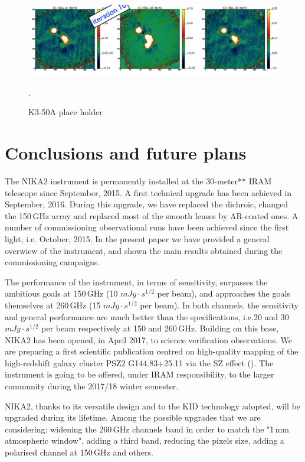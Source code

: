 \documentclass[]{aa} %
\begin{document}
\begin{figure}[h]
   \centering
   \includegraphics[width=.95\linewidth]{K3-50A.png}
   \caption{K3-50A place holder}. 
   \label{fig:k3-50a}
\end{figure}





\section{Conclusions and future plans}

The NIKA2 instrument is permanently installed at the 30-meter** IRAM telescope since September, 2015. A first technical upgrade has been achieved in September, 2016. During this upgrade, we have replaced the dichroic, changed the 150\,GHz array and replaced most of the smooth lenses by AR-coated ones. A number of commissioning observational runs have been achieved since the first light, i.e. October, 2015. In the present paper we have provided a general overwiew of the instrument, and shown the main results obtained during the commissioning campaigns. 

The performance of the instrument, in terms of sensitivity, surpasses the ambitious goals at 150\,GHz (10 $mJy \cdot s^{1/2}$ per beam), and approaches the goals themselves at 260\,GHz (15 $mJy \cdot s^{1/2}$ per beam). In both channels, the sensitivity and general performance are much better than the specifications, i.e.20 and 30 $mJy \cdot s^{1/2}$ per beam respectively at 150 and 260\,GHz. Building on this base, NIKA2 has been opened, in April 2017, to science verification observations. We are preparing a first scientific publication centred on high-quality mapping of the high-redshift galaxy cluster PSZ2 G144.83+25.11 via the SZ effect (\cite{Ruppin2017}). The instrument is going to be offered, under IRAM responsibility, to the larger community during the 2017/18 winter semester. 

NIKA2, thanks to its versatile design and to the KID technology adopted, will be upgraded during its lifetime. Among the possible upgrades that we are considering: widening the 260\,GHz channels band in order to match the "1\,mm atmospheric window", adding a third band, reducing the pixels size, adding a polarised channel at 150\,GHz and others. 
\end{document}
